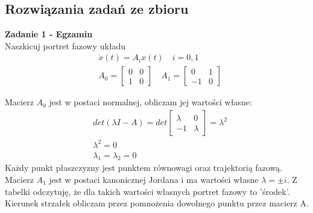 \documentclass[a4paper,11pt]{article}
\begin{document}
\subsection{Rozwiązania zadań ze zbioru}
\begin{framed}
\textbf{Zadanie 1 - Egzamin } \\ 
Naszkicuj portret fazowy układu
\begin{align*}
&\dot{x}(t)=A_{i}x(t) \quad
i = 0,1 \\
&A_{0} = 
\begin{bmatrix}
0 & 0 \\
1 & 0
\end{bmatrix}
\quad
A_{1} = 
\begin{bmatrix}
0 & 1 \\
-1 & 0
\end{bmatrix}
\end{align*}
\end{framed}
Macierz \( A_{0} \) jest w postaci normalnej, obliczam jej wartości własne:
\begin{align*}
&det (\lambda I-A)=
det \begin{bmatrix}
\lambda & 0 \\
-1 & \lambda
\end{bmatrix} =
\lambda^{2} \\
&\lambda ^{2} = 0 \\
&\lambda _{1} = \lambda _{2} = 0
\end{align*}
Każdy punkt płaszczyzny jest punktem równowagi oraz trajektorią fazową. \\
Macierz \( A_{1} \) jest w postaci kanonicznej Jordana i ma wartości własne \( \lambda = \pm i \). Z tabelki odczytuję, że dla takich wartości własnych portret fazowy to 'środek'. Kierunek strzałek obliczam przez pomnożenia dowolnego punktu przez macierz A.
 
\begin{figure}[!h]
\begin{center}
\end{center}
\end{figure}
\end{document}
